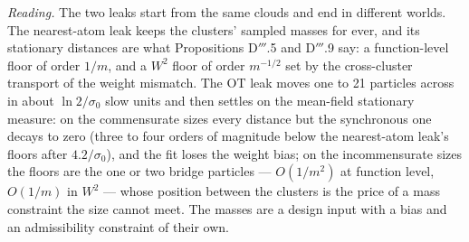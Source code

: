 \smallskip
\noindent\emph{Reading.} The two leaks start from the same clouds and end in different worlds. The nearest-atom
leak keeps the clusters' sampled masses for ever, and its stationary distances are what Propositions D$'''$.5 and
D$'''$.9 say: a function-level floor of order $1/m$, and a $W^2$ floor of order $m^{-1/2}$ set by the cross-cluster
transport of the weight mismatch. The OT leak moves one to 21 particles across in about $\ln2/\sigma_0$ slow units
and then settles on the mean-field stationary measure: on the commensurate sizes every distance but the synchronous
one decays to zero (three to four orders of magnitude below the nearest-atom leak's floors after $4.2/\sigma_0$),
and the fit loses the weight bias; on the incommensurate sizes the floors are the one or two bridge particles ---
$O(1/m^2)$ at function level, $O(1/m)$ in $W^2$ --- whose position between the clusters is the price of a mass
constraint the size cannot meet. The masses are a design input with a bias and an admissibility constraint of their
own.


